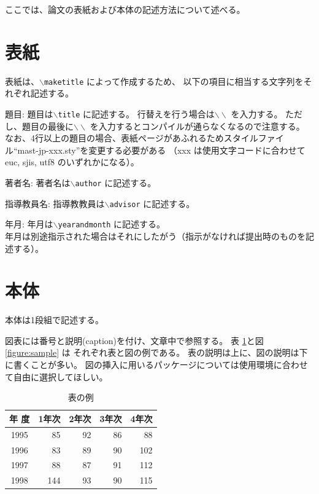 \documentclass[a4paper,11pt]{jreport}
\begin{document}
ここでは、論文の表紙および本体の記述方法について述べる。

\section{表紙}

表紙は、{\tt $\backslash$maketitle} によって作成するため、
以下の項目に相当する文字列をそれぞれ記述する。

\begin{description} \parskip=1pt
\item{題目: }
	題目は{\tt $\backslash$title} に記述する。
	行替えを行う場合は$\backslash\backslash$ を入力する。
	ただし、題目の最後に$\backslash\backslash$ を入力するとコンパイルが通らなくなるので注意する。
	なお、4行以上の題目の場合、表紙ページがあふれるためスタイルファイル``mast-jp-xxx.sty''を変更する必要がある
	（xxx は使用文字コードに合わせて euc, sjis, utf8 のいずれかになる）。
\item{著者名: }
	著者名は{\tt $\backslash$author} に記述する。
\item{指導教員名: }
	指導教教員は{\tt $\backslash$advisor} に記述する。
\item{年月: }
	年月は{\tt $\backslash$yearandmonth} に記述する。
	\\
	年月は別途指示された場合はそれにしたがう（指示がなければ提出時のものを記述する）。
\end{description}

\section{本体}

本体は1段組で記述する。

図表には番号と説明(caption)を付け、文章中で参照する。
表 \ref{table:fundamental_data_type}と図\ref{figure:sample} は
それぞれ表と図の例である。
表の説明は上に、図の説明は下に書くことが多い。
図の挿入に用いるパッケージについては使用環境に合わせて自由に選択してほしい。

\begin{table}[hbt]
\caption{表の例}
\label{table:fundamental_data_type}
\begin{center}
\begin{tabular}{| c | r | r | r | r |}
\hline
年 度 & 1年次 & 2年次 & 3年次 & 4年次 \\
\hline
1995 & 85 & 92 & 86 & 88 \\
1996 & 83 & 89 & 90 & 102 \\
1997 & 88 & 87 & 91 & 112 \\
1998 & 144 & 93 & 90 & 115 \\
\hline 
\end{tabular}
\end{center}
\end{table}
\medskip
\end{document}
